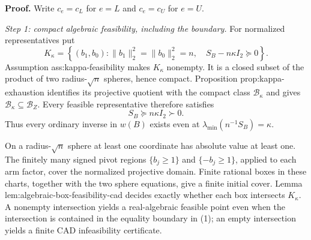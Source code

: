 \textbf{Proof.}
Write \(c_e=c_L\) for \(e=L\) and \(c_e=c_U\) for \(e=U\).

\emph{Step 1: compact algebraic feasibility, including the boundary.}
For normalized representatives put
\[
K_\kappa=
\left\{(b_1,b_0):
\lVert b_1\rVert_2^2=\lVert b_0\rVert_2^2=n,
\quad S_B-n\kappa I_2\succeq0
\right\}.
\]
Assumption ass:kappa-feasibility makes \(K_\kappa\) nonempty.  It is a closed subset of the product of two radius-\(\sqrt n\) spheres, hence compact.  Proposition prop:kappa-exhaustion identifies its projective quotient with the compact class \(\mathcal B_\kappa\) and gives \(\mathcal B_\kappa\subseteq\mathcal B_Z\).  Every feasible representative therefore satisfies
\[
S_B\succeq n\kappa I_2\succ0. \tag{1}
\]
Thus every ordinary inverse in \(w(B)\) exists even at
\(\lambda_{\min}(n^{-1}S_B)=\kappa\).

On a radius-\(\sqrt n\) sphere at least one coordinate has absolute value at least one.  The finitely many signed pivot regions \(\{b_j\ge1\}\) and \(\{-b_j\ge1\}\), applied to each arm factor, cover the normalized projective domain.  Finite rational boxes in these charts, together with the two sphere equations, give a finite initial cover.  Lemma lem:algebraic-box-feasibility-cad decides exactly whether each box intersects \(K_\kappa\).  A nonempty intersection yields a real-algebraic feasible point even when the intersection is contained in the equality boundary in (1); an empty intersection yields a finite CAD infeasibility certificate.

